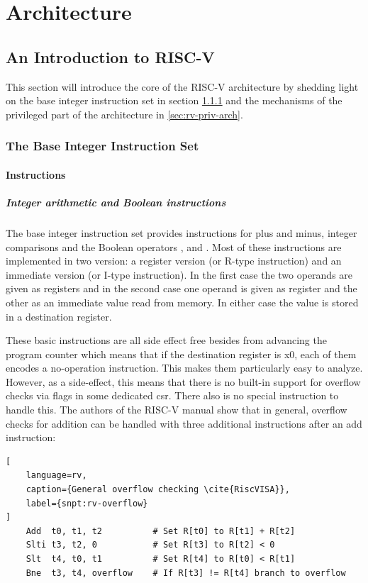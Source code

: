 
\section{Architecture}
\label{sec:arch}

\subsection{An Introduction to RISC-V}

This section will introduce the core of the RISC-V architecture by shedding light on the base integer instruction set in section \ref{sec:rv-base-int-isa} and the mechanisms of the privileged part of the architecture in \ref{sec:rv-priv-arch}.

\subsubsection{The Base Integer Instruction Set}
\label{sec:rv-base-int-isa}

\paragraph{Instructions}

\subparagraph{Integer arithmetic and Boolean instructions}
The base integer instruction set provides instructions for plus and minus, integer comparisons and the Boolean operators ,  and .
Most of these instructions are implemented in two version: a register version (or R-type instruction) and an immediate version (or I-type instruction).
In the first case the two operands are given as registers and in the second case one operand is given as register and the other as an immediate value read from memory.
In either case the value is stored in a destination register.

These basic instructions are all side effect free besides from advancing the program counter which means that if the destination register is x0, each of them encodes a no-operation instruction.
This makes them particularly easy to analyze.
However, as a side-effect, this means that there is no built-in support for overflow checks via flags in some dedicated \gls{csr}.
There also is no special instruction to handle this.
The authors of the RISC-V manual show that in general, overflow checks for addition can be handled with three additional instructions after an add instruction:

\begin{lstlisting}[
    language=rv,
    caption={General overflow checking \cite{RiscVISA}},
    label={snpt:rv-overflow}
]
    Add  t0, t1, t2          # Set R[t0] to R[t1] + R[t2]
    Slti t3, t2, 0           # Set R[t3] to R[t2] < 0
    Slt  t4, t0, t1          # Set R[t4] to R[t0] < R[t1]
    Bne  t3, t4, overflow    # If R[t3] != R[t4] branch to overflow
\end{lstlisting}

